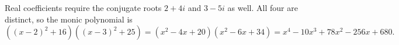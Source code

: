 Real coefficients require the conjugate roots $ 2+4i $ and $ 3-5i $ as well. All four are distinct, so the monic polynomial is \[((x-2)^2+16)((x-3)^2+25)=(x^2-4x+20)(x^2-6x+34)=\boxed{x^4-10x^3+78x^2-256x+680}.\]

